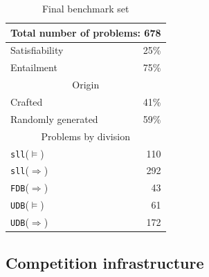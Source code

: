 \documentclass[twoside,11pt]{article}
\newcommand{\limp}{\Rightarrow}
\newcommand{\sllsat}{\texttt{sll}($\models$)}
\newcommand{\sllent}{\texttt{sll}($\limp$)}
\newcommand{\FDBent}{\texttt{FDB}($\limp$)}
\newcommand{\UDBsat}{\texttt{UDB}($\models$)}
\newcommand{\UDBent}{\texttt{UDB}($\limp$)}
\begin{document}
\begin{table}
\caption{Final benchmark set}
\label{tab:bench}
\vspace{-3eX}
\begin{center}
\begin{tabular}{p{6cm}r}\hline
\multicolumn{2}{c}{Total number of problems: 678} \\
\hline
Satisfiability & 25\% \\
Entailment & 75\% \\
\hline
%
\hline
\multicolumn{2}{c}{Origin} \\
\hline
Crafted & 41\% \\
Randomly generated & 59\% \\
\hline
%
\hline
\multicolumn{2}{c}{Problems by division} \\
\hline
\sllsat & 110 \\ %
\sllent & 292 \\ %
\FDBent &  43 \\ %
\UDBsat &  61 \\ %
\UDBent & 172 \\
\hline
\end{tabular}
\end{center}
\end{table}


\subsection{Competition infrastructure}
\end{document}
